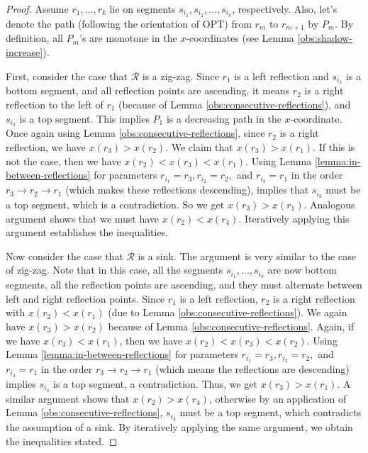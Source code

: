 \documentclass[pdflatex,sn-mathphys-num]{sn-jnl}
\theoremstyle{thmstyleone}
\newcommand{\OPT}{{\text{OPT}}}
\begin{document}
\begin{proof}
	Assume $r_1,\ldots,r_k$ lie on segments $s_{i_1},s_{i_2},
	\ldots,s_{i_k}$, respectively. Also, let's denote the path (following the orientation of $\OPT$) from $r_m$ to $r_{m+1}$ by $P_m$. By definition, all $P_m$'s are monotone in the $x$-coordinates (see Lemma \ref{obs:shadow-increase}).
	
	First, consider the case that $\mathcal R$ is a zig-zag.
	Since $r_1$ is a left reflection and $s_{i_1}$ is a bottom segment,
	and all reflection points are ascending, it means $r_2$ is a right reflection to the left of $r_1$ (because of Lemma \ref{obs:consecutive-reflections}), and $s_{i_2}$ is a top segment. This implies $P_1$ is a decreasing path in the $x$-coordinate. 
	Once again using Lemma \ref{obs:consecutive-reflections}, since $ r_2 $ is a right reflection, we have $x(r_3) > x(r_2)$.
	We claim that $x(r_3) > x(r_1)$. If this is not the case, then we have $x(r_2) < x(r_3) < x(r_1)$. 
	Using Lemma \ref{lemma:in-between-reflections} for parameters $r_{i_1} = r_3, r_{i_2} = r_2, $ and $r_{i_3} = r_1$ in the order $r_3 \to r_2 \to r_1$ (which makes these reflections descending), implies that $s_{i_3}$ must be a top segment, which is a contradiction. So we get $x(r_3) > x(r_1)$. 
	Analogous argument shows that we must have $x(r_2)<x(r_4)$. Iteratively applying this argument establishes the inequalities.
	        
	Now consider the case that $\mathcal R$ is a sink. The argument is very similar to the case of zig-zag. Note that in this case, all the segments $s_{i_1},\ldots,s_{i_k}$ are now bottom segments, all the reflection points are ascending, and they must alternate between left and right reflection points.
	Since $r_1$ is a left reflection, $r_2$ is a right reflection with $x(r_2)<x(r_1)$ (due to Lemma \ref{obs:consecutive-reflections}). 
	We again have $x(r_3) > x(r_2)$
	because of Lemma \ref{obs:consecutive-reflections}.
	Again, if we have $x(r_3) < x(r_1)$, then we have $x(r_2) < x(r_3) < x(r_2)$.
	Using Lemma \ref{lemma:in-between-reflections} for parameters $r_{i_1} = r_3, r_{i_2} = r_2,$ and $r_{i_3} = r_1$ in the order $r_3 \to r_2 \to r_1$ (which means the reflections are descending) implies $s_{i_3}$ is a top segment, a contradiction. Thus, we get $x(r_3) > x(r_1)$.
	A similar argument shows that $x(r_2)>x(r_4)$, otherwise by an application of Lemma \ref{obs:consecutive-reflections},  $s_{i_4}$ must be a top segment, which contradicts the assumption of a sink.
	By iteratively applying the same argument, we obtain the inequalities stated.
\end{proof}
\end{document}
